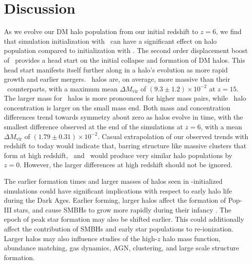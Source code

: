 
%
%

\section{Discussion}
\label{sec:discussion}







As we evolve our DM halo population from our initial redshift to $z = 6$, we find that simulation initialization with \lpt\ can have a significant effect on halo population compared to initialization with \za.  The second order displacement boost of \lpt\ provides a head start on the initial collapse and formation of DM halos.  This head start manifests itself further along in a halo's evolution as more rapid growth and earlier mergers.  \lpt\ halos are, on average, more massive than their \za\ counterparts, with a maximum mean $\Delta M_{\mathrm{vir}}$ of $(9.3 \pm 1.2) \times 10^{-2}$ at $z = 15$.  The larger mass for \lpt\ halos is more pronounced for higher mass pairs, while \lpt\ halo concentration is larger on the small mass end.  Both mass and concentration differences trend towards symmetry about zero as halos evolve in time, with the smallest difference observed at the end of the simulations at $z = 6$, with a mean $\Delta M_{\mathrm{vir}}$ of $(1.79 \pm 0.31) \times 10^{-2}$.  Casual extrapolation of our observed trends with redshift to today would indicate that, barring structure like massive clusters that form at high redshift, \lpt\ and \za\ would produce very similar halo populations by $z = 0$.  However, the larger differences at high redshift should not be ignored.






The earlier formation times and larger masses of halos seen in \lpt-initialized simulations could have significant implications with respect to early halo life during the Dark Ages.  Earlier forming, larger halos affect the formation of Pop-III stars, and cause SMBHs to grow more rapidly during their infancy \citep{2012ApJ...761L...8H}.  The epoch of peak star formation may also be shifted earlier.  This could additionally affect the contribution of SMBHs and early star populations to re-ionization.  Larger halos may also influence studies of the high-$z$ halo mass function, abundance matching, gas dynamics, AGN, clustering, and large scale structure formation.

